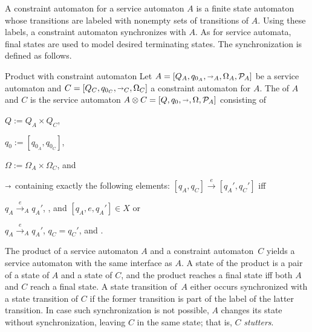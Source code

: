 A constraint automaton for a service automaton $A$ is a finite state automaton whose transitions are labeled with nonempty sets of transitions of $A$. Using these labels, a constraint automaton synchronizes with $A$. As for service automata, final states are used to model desired terminating states. The synchronization is defined as follows.

\enlargethispage*{\baselineskip}

\begin{definition}{Product with constraint automaton}%
%
\label{def:product1}%
Let $A=[Q_{A},q_{0_{A}},{\shortrightarrow}_{A},\Omega_{A},\mathcal{P}_{A}]$ be a service automaton and $C=[Q_{C},q_{0_{C}},{\shortrightarrow}_{C},\Omega_{C}]$ a constraint automaton for $A$. The  of $A$ and $C$ is the service automaton $A\otimes C=[Q,q_{0},{\shortrightarrow},\Omega,\mathcal{P}_{A}]$ consisting of
\begin{myitemize}
\item $Q:=Q_{A}\times Q_{C}$,
\item $q_{0}:=[q_{0_{A}},q_{0_{C}}]$,
\item $\Omega:=\Omega_{A}\times\Omega_{C}$, and
\item $\shortrightarrow$ containing exactly the following elements: $[q_{A},q_{C}]\xrightarrow{e}[q_{A}',q_{C}']$ iff
\begin{myenumerate}
\item $q_{A}\xrightarrow{e}_{A}q_{A}'$, , and $[q_{A},e,q_{A}']\in X$ or
\item $q_{A}\xrightarrow{e}_{A}q_{A}'$, $q_{C}=q_{C}'$, and .
\end{myenumerate}
\end{myitemize}
\end{definition}

The product of a service automaton $A$ and a constraint automaton~$C$ yields a service automaton with the same interface as $A$. A state of the product is a pair of a state of $A$ and a state of $C$, and the product reaches a final state iff both $A$ and $C$ reach a final state. A state transition of~$A$ either occurs synchronized with a state transition of $C$ if the former transition is part of the label of the latter transition. In case such synchronization is not possible, $A$ changes its state without synchronization, leaving $C$ in the same state; that is, $C$ \emph{stutters}.

